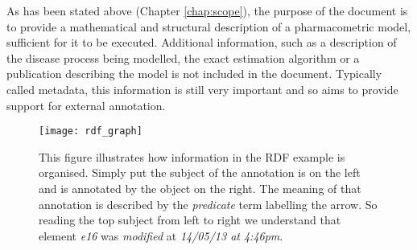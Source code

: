 As has been stated above (Chapter \ref{chap:scope}), the purpose of
the \pharmml document is to provide a mathematical and structural
description of a pharmacometric model, sufficient for it to be
executed. Additional information, such as a description of the disease
process being modelled, the exact estimation algorithm or a
publication describing the model is not included in the \pharmml
document. Typically called metadata,
this information is still very important and so \pharmml aims to
provide support for external annotation.

\begin{figure}[htbp]
\centering
\texttt{[image: rdf\_graph]}
\caption{This figure illustrates how information in the RDF example is
organised. Simply put the subject of the annotation is on the left and
is annotated by the object on the right. The meaning of that
annotation is described by the \emph{predicate} term labelling the
arrow. So reading the top subject from left to right we understand that
element \emph{e16} was \emph{modified} at \emph{14/05/13 at 4:46pm}.}
\label{fig:rdf-graph}
\end{figure}


